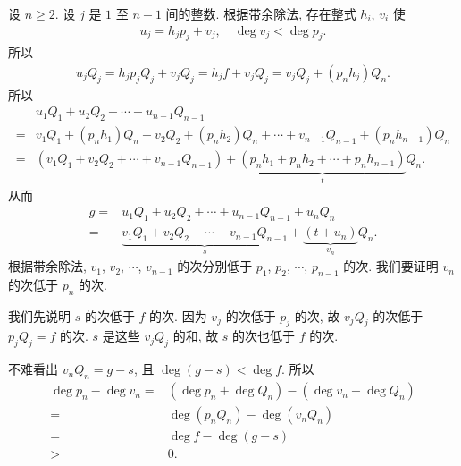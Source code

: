 \begin{pf}
    设 $n \geq 2$. 设 $j$ 是 $1$ 至 $n-1$ 间的整数. 根据带余除法, 存在整式 $h_i$, $v_i$ 使
    \begin{align*}
        u_j = h_j p_j + v_j, \quad \deg v_j < \deg p_j.
    \end{align*}
    所以
    \begin{align*}
        u_j Q_j = h_j p_j Q_j + v_j Q_j = h_j f + v_j Q_j = v_j Q_j + (p_n h_j) Q_n.
    \end{align*}
    所以
    \begin{align*}
             & u_1 Q_1 + u_2 Q_2 + \cdots + u_{n-1} Q_{n-1}                                                                      \\
        = {} & v_1 Q_1 + (p_n h_1) Q_n + v_2 Q_2 + (p_n h_2) Q_n + \cdots + v_{n-1} Q_{n-1} + (p_n h_{n-1}) Q_n                  \\
        = {} & (v_1 Q_1 + v_2 Q_2 + \cdots + v_{n-1} Q_{n-1}) + \underbrace{(p_n h_1 + p_n h_2 + \cdots + p_n h_{n-1})}_{t} Q_n.
    \end{align*}
    从而
    \begin{align*}
        g
        = {} & u_1 Q_1 + u_2 Q_2 + \cdots + u_{n-1} Q_{n-1} + u_n Q_n                                              \\
        = {} & {\underbrace{v_1 Q_1 + v_2 Q_2 + \cdots + v_{n-1} Q_{n-1}}_{s}} + \underbrace{(t + u_n)}_{v_n} Q_n.
    \end{align*}
    根据带余除法, $v_1$, $v_2$, $\cdots$, $v_{n-1}$ 的次分别低于 $p_1$, $p_2$, $\cdots$, $p_{n-1}$ 的次. 我们要证明 $v_n$ 的次低于 $p_n$ 的次.

    我们先说明 $s$ 的次低于 $f$ 的次. 因为 $v_j$ 的次低于 $p_j$ 的次, 故 $v_j Q_j$ 的次低于 $p_j Q_j = f$ 的次. $s$ 是这些 $v_j Q_j$ 的和, 故 $s$ 的次也低于 $f$ 的次.

    不难看出 $v_n Q_n = g - s$, 且 $\deg {(g - s)} < \deg f$. 所以
    \begin{align*}
        \deg p_n - \deg v_n
        = {} & (\deg p_n + \deg Q_n) - (\deg v_n + \deg Q_n) \\
        = {} & \deg {(p_n Q_n)} - \deg {(v_n Q_n)}           \\
        = {} & \deg f - \deg {(g - s)}                       \\
        > {} & 0.
    \end{align*}


\end{pf}
